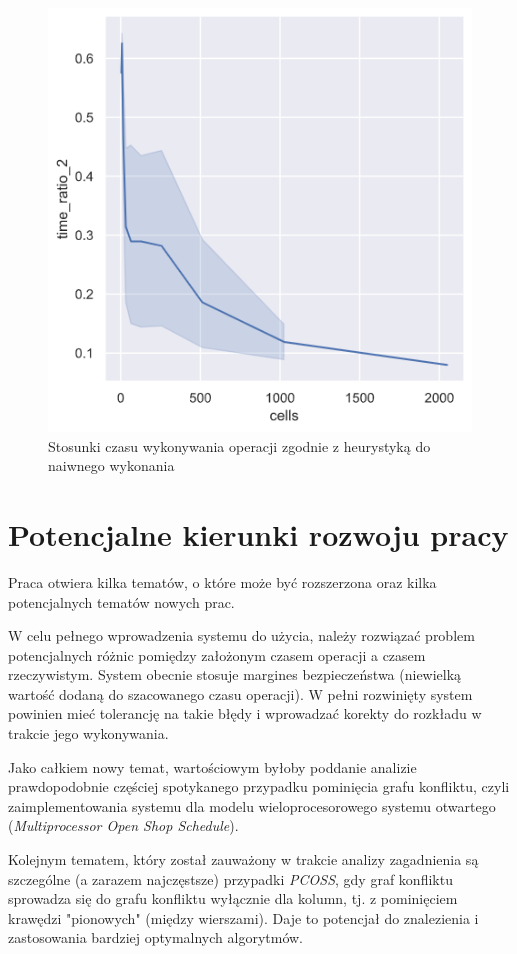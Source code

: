 \documentclass[brudnopis]{xmgr}
\begin{document}
\begin{figure}[!tbh]
\centering
\includegraphics[width=.7\hsize]{fig/time_ratio_2.png}
\caption{Stosunki czasu wykonywania operacji zgodnie z heurystyką do naiwnego wykonania \label{diag:time_ratio_2}}
\end{figure}\medskip



\chapter{Potencjalne kierunki rozwoju pracy} \label{chap:extend}

Praca otwiera kilka tematów, o które może być rozszerzona oraz kilka potencjalnych tematów nowych prac.
\medskip

W celu pełnego wprowadzenia systemu do użycia, należy rozwiązać problem potencjalnych różnic pomiędzy założonym czasem operacji a czasem rzeczywistym. System obecnie stosuje margines bezpieczeństwa (niewielką wartość dodaną do szacowanego czasu operacji).
W pełni rozwinięty system powinien mieć tolerancję na takie błędy i wprowadzać korekty do rozkładu w trakcie jego wykonywania.
\medskip

Jako całkiem nowy temat, wartościowym byłoby poddanie analizie prawdopodobnie częściej spotykanego przypadku pominięcia grafu konfliktu, czyli zaimplementowania systemu dla modelu wieloprocesorowego systemu otwartego (\emph{Multiprocessor Open Shop Schedule}).
\medskip

Kolejnym tematem, który został zauważony w trakcie analizy zagadnienia są szczególne (a zarazem najczęstsze) przypadki \emph{PCOSS}, gdy graf konfliktu sprowadza się do grafu konfliktu wyłącznie dla kolumn, tj. z pominięciem krawędzi "pionowych" (między wierszami). Daje to potencjał do znalezienia i zastosowania bardziej optymalnych algorytmów.
\medskip
\end{document}
